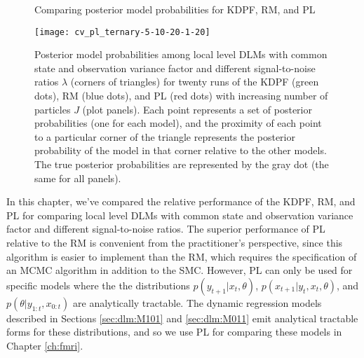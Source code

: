 \begin{figure}[ht]
\ssp
\centering
\caption{Comparing posterior model probabilities for KDPF, RM, and PL} \label{fig:comp:post}
\texttt{[image: cv\_pl\_ternary-5-10-20-1-20]}
\caption*{Posterior model probabilities among local level DLMs with common state and observation variance factor and different signal-to-noise ratios $\lambda$ (corners of triangles) for twenty runs of the KDPF (green dots), RM (blue dots), and PL (red dots) with increasing number of particles $J$ (plot panels). Each point represents a set of posterior probabilities (one for each model), and the proximity of each point to a particular corner of the triangle represents the posterior probability of the model in that corner relative to the other models. The true posterior probabilities are represented by the gray dot (the same for all panels).}
\end{figure}

In this chapter, we've compared the relative performance of the KDPF, RM, and PL for comparing local level DLMs with common state and observation variance factor and different signal-to-noise ratios. The superior performance of PL relative to the RM is convenient from the practitioner's perspective, since this algorithm is easier to implement than the RM, which requires the specification of an MCMC algorithm in addition to the SMC. However, PL can only be used for specific models where the the distributions $p(y_{t+1}|x_t,\theta)$, $p(x_{t+1}|y_t,x_t,\theta)$, and $p(\theta|y_{1:t},x_{0:t})$ are analytically tractable. The dynamic regression models described in Sections \ref{sec:dlm:M101} and \ref{sec:dlm:M011} emit analytical tractable forms for these distributions, and so we use PL for comparing these models in Chapter \ref{ch:fmri}. 